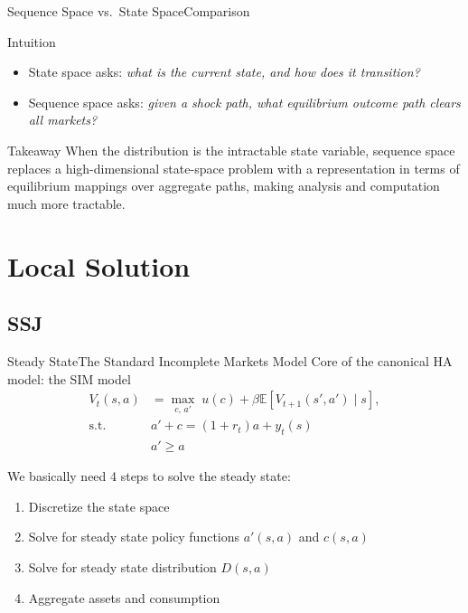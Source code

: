 \documentclass[aspectratio=169]{beamer}
\begin{document}
\begin{frame}{Sequence Space vs.\ State Space}{Comparison}

    \begin{block}{Intuition}
        \begin{itemize}
            \item State space asks: \emph{what is the current state, and how does it transition?}
            \item Sequence space asks: \emph{given a shock path, what equilibrium outcome path clears all markets?}
        \end{itemize}
    \end{block}

    \begin{block}{Takeaway}
        When the distribution is the intractable state variable, sequence space replaces a high-dimensional state-space problem with a representation in terms of \alert{equilibrium mappings over aggregate paths}, making analysis and computation much more tractable.
    \end{block}
\end{frame}



\section{Local Solution}


\subsection{SSJ}
\begin{frame}{Steady State}{The Standard Incomplete Markets Model}
    Core of the canonical HA model: the SIM model
    \begin{align}
        V_t (s, a) & = \max_{c,\, a'} \; u (c) + \beta \mathbb{E} \left[ V_{t+1} (s', a') \mid s \right], \label{eq:sim-bellman} \\
        \text{s.t.} \quad & a' + c = (1 + r_t) a + y_t (s) \\
        & a' \geq a
    \end{align} 

    We basically need 4 steps to solve the steady state:
    \begin{enumerate}
        \item Discretize the state space
        \item Solve for steady state policy functions $a'(s, a)$ and $c(s, a)$
        \item Solve for steady state distribution $D(s, a)$
        \item Aggregate assets and consumption
    \end{enumerate}
\end{frame}
\end{document}
